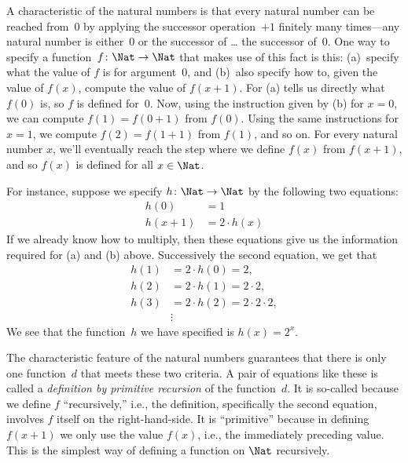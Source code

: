 \documentclass[../../../include/open-logic-section]{subfiles}
\begin{document}

A characteristic of the natural numbers is that every natural number
can be reached from~$0$ by applying the successor operation~$+1$
finitely many times---any natural number is either~$0$ or the
successor of \dots{} the successor of~$0$. One way to specify a
function~$f\colon\Nat \to \Nat$ that makes use of this fact is this:
(a)~specify what the value of $f$ is for argument~$0$, and (b)~also
specify how to, given the value of $f(x)$, compute the value of
$f(x+1)$. For (a) tells us directly what $f(0)$ is, so $f$ is defined
for~$0$. Now, using the instruction given by (b) for $x=0$, we can
compute $f(1) = f(0+1)$ from $f(0)$. Using the same instructions for
$x=1$, we compute $f(2) = f(1+1)$ from $f(1)$, and so on. For every
natural number $x$, we'll eventually reach the step where we define
$f(x)$ from $f(x+1)$, and so $f(x)$ is defined for all $x \in \Nat$.

For instance, suppose we specify $h\colon \Nat \to \Nat$ by the following
two equations:
\begin{align*}
h(0) & =  1\\
h(x+1) & =  2 \cdot h(x)
\end{align*}
If we already know how to multiply, then these equations give us the
information required for (a) and (b) above. Successively the second
equation, we get that
\begin{align*}
  h(1) & = 2\cdot h(0) = 2,\\
  h(2) & = 2\cdot h(1) = 2\cdot 2,\\
  h(3) & = 2 \cdot h(2) = 2\cdot 2 \cdot 2,\\
  & \vdots
\end{align*}
We see that the function~$h$ we have specified is $h(x) = 2^x$.

The characteristic feature of the natural numbers guarantees that
there is only one function~$d$ that meets these two criteria.  A pair
of equations like these is called a \emph{definition by primitive
  recursion} of the function~$d$. It is so-called because we define
$f$ ``recursively,'' i.e., the definition, specifically the second
equation, involves $f$ itself on the right-hand-side. It is
``primitive'' because in defining $f(x+1)$ we only use the value
$f(x)$, i.e., the immediately preceding value. This is the simplest
way of defining a function on $\Nat$ recursively.
\end{document}
